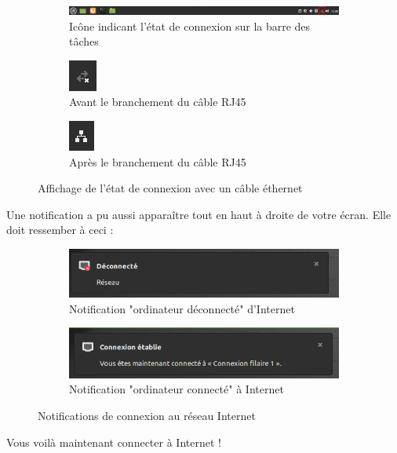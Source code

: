 \documentclass[12pt]{book}
\begin{document}
		\begin{figure}[h]
		\begin{subfigure}{\textwidth}
			\centering
			\includegraphics[width=\textwidth]{include/connexion_barre.png}
			\caption{Icône indicant l'état de connexion sur la barre des tâches}
			\label{fig:barre_taches_connexion}
		\end{subfigure}\newline
		\begin{subfigure}{.5\textwidth}
		  \centering
		  \includegraphics{include/non_connect.png}
		  \caption{Avant le branchement du \newline câble RJ45}
		  \label{fig:non_connect_rj45}
		\end{subfigure}
		\begin{subfigure}{.5\textwidth}
		  \centering
		  \includegraphics{include/connect.png}
		  \caption{Après le branchement du \newline câble RJ45}
		  \label{fig:connect_rj45}
		\end{subfigure}
		\caption{Affichage de l'état de connexion avec un câble éthernet}
		\label{fig:connexion_rj45}
		\end{figure}\par
		Une notification a pu aussi apparaître tout en haut à droite de votre écran.
		Elle doit ressember à ceci :
		\begin{figure}[h]
			\centering
			\begin{subfigure}{.49\textwidth}
				\centering
				\includegraphics[width=\textwidth]{include/notif_deco.png}
				\caption{Notification "ordinateur déconnecté" d'Internet}
				\label{fig:notif_deco_rj45}
			\end{subfigure}
			\begin{subfigure}{.5\textwidth}
				\centering
				\includegraphics[width=\textwidth]{include/notif_co.png}
				\caption{Notification "ordinateur connecté" à Internet}
				\label{fig:notif_co_rj45}
			\end{subfigure}
			\label{fig:notif_connexion_rj45}
			\caption{Notifications de connexion au réseau Internet}
		\end{figure}\par
		Vous voilà maintenant connecter à Internet !
\end{document}
